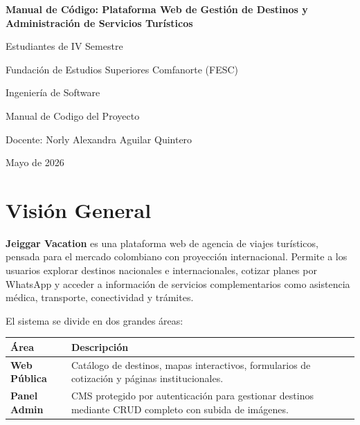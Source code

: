 \documentclass[12pt,letterpaper]{article}
\begin{document}
\begin{titlepage}
    \centering
    \vspace*{1.5in}

    {\bfseries\Large Manual de Código: Plataforma Web de Gestión de Destinos y Administración de Servicios Turísticos\par}
    \vspace{0.5in}

    {Estudiantes de IV Semestre\par}
    \vspace{0.2in}

    {Fundación de Estudios Superiores Comfanorte (FESC)\par}
    {Ingeniería de Software\par}
    \vspace{0.2in}

    {Manual de Codigo del Proyecto\par}
    \vspace{0.2in}

    {Docente: Norly Alexandra Aguilar Quintero \par}
    \vspace{0.2in}

    {Mayo de 2026\par}
\end{titlepage}

\newpage
\tableofcontents
\newpage
\section{Visión General}

\textbf{Jeiggar Vacation} es una plataforma web de agencia de viajes turísticos, pensada para el mercado colombiano con proyección internacional. Permite a los usuarios explorar destinos nacionales e internacionales, cotizar planes por WhatsApp y acceder a información de servicios complementarios como asistencia médica, transporte, conectividad y trámites.

El sistema se divide en dos grandes áreas:

\begin{longtable}{>{\bfseries}p{} p{}}
\toprule
Área & Descripción \\
\midrule
Web Pública & Catálogo de destinos, mapas interactivos, formularios de cotización y páginas institucionales. \\
Panel Admin & CMS protegido por autenticación para gestionar destinos mediante CRUD completo con subida de imágenes. \\
\bottomrule
\end{longtable}
\end{document}
